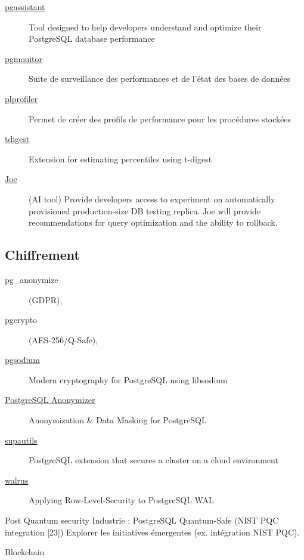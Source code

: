 \documentclass[a4paper,12pt]{article}
\begin{document}
\begin{multicols*}{2}
\begin{description}
\item[{\href{https://github.com/nexsol-technologies/pgassistant}{pgassistant}}] Tool designed to help developers understand and optimize their PostgreSQL database performance
\item[{\href{https://github.com/CrunchyData/pgmonitor-extension}{pgmonitor}}] Suite de surveillance des performances et de l'état des bases de données
\item[{\href{https://github.com/bigsql/plprofiler}{plprofiler}}] Permet de créer des profils de performance pour les procédures stockées
\item[{\href{https://github.com/tvondra/tdigest}{tdigest}}] Extension for estimating percentiles using t-digest
\item[{\href{https://gitlab.com/postgres-ai/joe}{Joe}}] (AI tool) Provide developers access to experiment on automatically provisioned production-size DB testing replica. Joe will provide recommendations for query optimization and the ability to rollback.
\end{description}
\subsection*{Chiffrement}
\label{sec:org2ee2cb6}
\begin{description}
\item[{pg\_anonymize}] (GDPR),
\item[{pgcrypto}] (AES-256/Q-Safe),
\item[{\href{https://github.com/michelp/pgsodium}{pgsodium}}] Modern cryptography for PostgreSQL using libsodium
\item[{\href{https://gitlab.com/dalibo/postgresql\_anonymizer}{PostgreSQL Anonymizer}}] Anonymization \& Data Masking for PostgreSQL
\item[{\href{https://github.com/supabase/supautils}{supautils}}] PostgreSQL extension that secures a cluster on a cloud environment
\item[{\href{https://github.com/supabase/walrus}{walrus}}] Applying Row-Level-Security to PostgreSQL WAL
\end{description}

Post Quantum security
Industrie : PostgreSQL Quantum-Safe (NIST PQC integration [23])
Explorer les initiatives émergentes (ex. intégration NIST PQC).

Blockchain

\end{multicols*}
\end{document}
